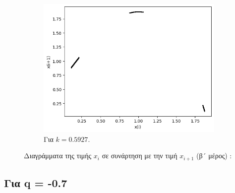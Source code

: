\begin{figure}[h!]
\begin{subfigure}[b]{0.4\textwidth}
		\includegraphics[width=\textwidth]{LateX images/graphs q05/g11}
		\caption{Για $k=0.5927$.}
		\label{f:k36}
	\end{subfigure}
	\hfill
\caption{Διαγράμματα της τιμής \(x_i\) σε συνάρτηση με την τιμή \(x_{i+1}\) (β´ μέρος) :}		
\end{figure}

 \clearpage

\subsection{Για q = -0.7}

